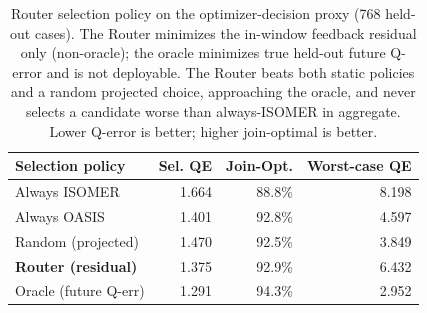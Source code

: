 \begin{table}[t]
  \centering\small
  \caption{Router selection policy on the optimizer-decision proxy (768 held-out cases). The Router minimizes the in-window feedback residual only (non-oracle); the oracle minimizes true held-out future Q-error and is not deployable. The Router beats both static policies and a random projected choice, approaching the oracle, and never selects a candidate worse than always-ISOMER in aggregate. Lower Q-error is better; higher join-optimal is better.}
  \label{tab:router_diagnostics}
  \setlength{\tabcolsep}{6pt}
  \begin{tabular}{l rrr}
    \toprule
    Selection policy & Sel. QE & Join-Opt. & Worst-case QE \\
    \midrule
    Always ISOMER & 1.664 & 88.8\% & 8.198 \\
    Always OASIS & 1.401 & 92.8\% & 4.597 \\
    Random (projected) & 1.470 & 92.5\% & 3.849 \\
    \textbf{Router (residual)} & 1.375 & 92.9\% & 6.432 \\
    Oracle (future Q-err) & 1.291 & 94.3\% & 2.952 \\
    \bottomrule
  \end{tabular}
\end{table}
